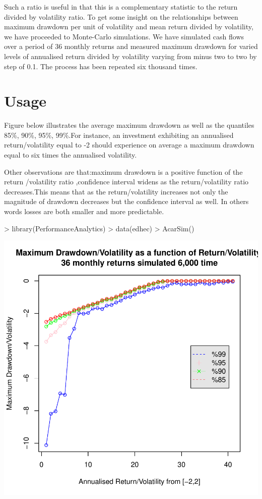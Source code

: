 \documentclass[12pt,letterpaper,english]{article}
\begin{document}
Such a ratio is useful in that this is a complementary statistic to the return divided by volatility ratio. To get some insight on the relationships between maximum drawdown per unit of volatility and mean  return divided by volatility, we have proceeded to Monte-Carlo simulations. We have simulated cash flows over a period of 36 monthly returns and measured maximum drawdown for varied levels of  annualised return divided by volatility varying from minus two to two by step of 0.1. The process has  been repeated six thousand times.

\section{Usage}
Figure below illustrates the average maximum drawdown as well as the quantiles 85\%, 90\%, 95\%, 99\%.For instance, an investment exhibiting an annualised return/volatility equal to -2 should experience on average a maximum drawdown equal to six times the annualised volatility.

Other observations are that:maximum drawdown is a positive function of the return /volatility ratio ,confidence interval widens as the return/volatility ratio decreases.This means that as the return/volatility increases not only the magnitude of drawdown decreases but the confidence interval as well. In others words losses are both smaller and more predictable.

\begin{Schunk}
\begin{Sinput}
> library(PerformanceAnalytics)
> data(edhec)
> AcarSim()
\end{Sinput}
\end{Schunk}
\includegraphics{ShaneAcarMaxLoss-003}
\end{document}
